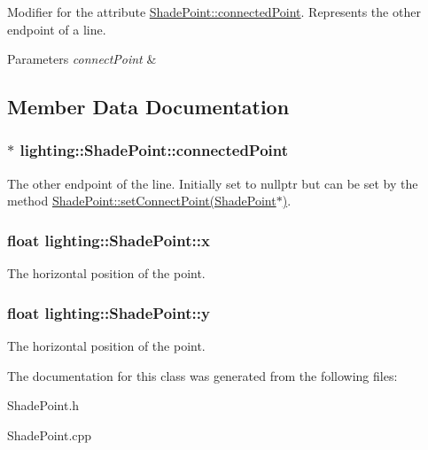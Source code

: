 Modifier for the attribute \hyperlink{classlighting_1_1ShadePoint_a0840495febcd385a90e89e003aa15972}{Shade\+Point\+::connected\+Point}. Represents the other endpoint of a line. 


\begin{DoxyParams}{Parameters}
{\em connect\+Point} & \\
\hline
\end{DoxyParams}


\subsection{Member Data Documentation}
\subsubsection[{\texorpdfstring{connected\+Point}{connectedPoint}}]{$\ast$ lighting\+::\+Shade\+Point\+::connected\+Point\hspace{0.3cm}{\ttfamily [protected]}}\hypertarget{classlighting_1_1ShadePoint_a0840495febcd385a90e89e003aa15972}{}\label{classlighting_1_1ShadePoint_a0840495febcd385a90e89e003aa15972}


The other endpoint of the line. Initially set to {\ttfamily nullptr} but can be set by the method \hyperlink{classlighting_1_1ShadePoint_a6d8d66a55dd8b16974bf138bbfcac183}{Shade\+Point\+::set\+Connect\+Point(\+Shade\+Point$\ast$)}. 

\subsubsection[{\texorpdfstring{x}{x}}]{\setlength{\rightskip}{0pt plus 5cm}float lighting\+::\+Shade\+Point\+::x}\hypertarget{classlighting_1_1ShadePoint_a087db3eacccf6731f674f123c22400ec}{}\label{classlighting_1_1ShadePoint_a087db3eacccf6731f674f123c22400ec}


The horizontal position of the point. 

\subsubsection[{\texorpdfstring{y}{y}}]{\setlength{\rightskip}{0pt plus 5cm}float lighting\+::\+Shade\+Point\+::y}\hypertarget{classlighting_1_1ShadePoint_a427350496a448f0dd7424955a6c21ea2}{}\label{classlighting_1_1ShadePoint_a427350496a448f0dd7424955a6c21ea2}


The horizontal position of the point. 



The documentation for this class was generated from the following files\+:\begin{DoxyCompactItemize}
\item 
Shade\+Point.\+h\item 
Shade\+Point.\+cpp\end{DoxyCompactItemize}
